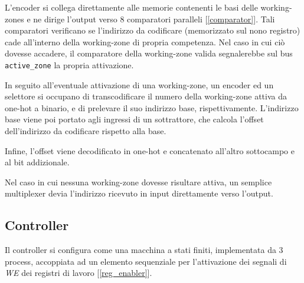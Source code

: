 \documentclass[11pt,a4paper]{article}
\begin{document}
L'encoder si collega direttamente alle memorie contenenti le basi delle working-zones e ne dirige l'output verso 8 comparatori paralleli [\ref{comparator}].
Tali comparatori verificano se l'indirizzo da codificare (memorizzato sul nono registro) cade all'interno della working-zone di propria competenza. Nel caso
in cui ciò dovesse accadere, il comparatore della working-zone valida segnalerebbe sul bus \lstinline{active_zone} la propria attivazione.

In seguito all'eventuale attivazione di una working-zone, un encoder ed un selettore si occupano di transcodificare il numero della working-zone attiva
da one-hot a binario, e di prelevare il suo indirizzo base, rispettivamente. L'indirizzo base viene poi portato agli ingressi di un sottrattore, che
calcola l'offset dell'indirizzo da codificare rispetto alla base.

Infine, l'offset viene decodificato in one-hot e concatenato all'altro sottocampo e al bit addizionale.

Nel caso in cui nessuna working-zone dovesse risultare attiva, un semplice multiplexer devia l'indirizzo ricevuto in input direttamente verso l'output.

\subsection{Controller}
Il controller si configura come una macchina a stati finiti, implementata da 3 process, accoppiata ad un elemento sequenziale per l'attivazione dei
segnali di \emph{WE} dei registri di lavoro [\ref{reg_enabler}].
\end{document}
